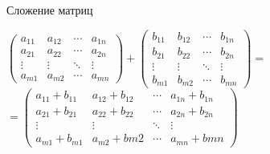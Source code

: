 \documentclass[10pt]{beamer}
\begin{document}
	\begin{frame}{Сложение матриц}
		
		$
		\begin{pmatrix} a_{11} & a_{12} & \cdots & a_{1n}
			\\a_{21} & a_{22} & \cdots & a_{2n}
			\\ \vdots & \vdots & \ddots & \vdots
			\\ a_{m1} & a_{m2} & \cdots & a_{mn}
		\end{pmatrix} 
		+
		\begin{pmatrix} b_{11} & b_{12} & \cdots & b_{1n}
			\\b_{21} & b_{22} & \cdots & b_{2n}
			\\ \vdots & \vdots & \ddots & \vdots
			\\ b_{m1} & b_{m2} & \cdots & b_{mn}
		\end{pmatrix} 
		=$
		$
		=
		\begin{pmatrix} a_{11}+b_{11} & a_{12}+b_{12} & \cdots & a_{1n}+b_{1n}
			\\a_{21}+b_{21} & a_{22}+b_{22} & \cdots & a_{2n}+b_{2n}
			\\ \vdots & \vdots & \ddots & \vdots
			\\ a_{m1}+b_{m1} & a_{m2}+b{m2} & \cdots & a_{mn}+b{mn}
		\end{pmatrix} 
		$
		
	\end{frame}
	
\end{document}
